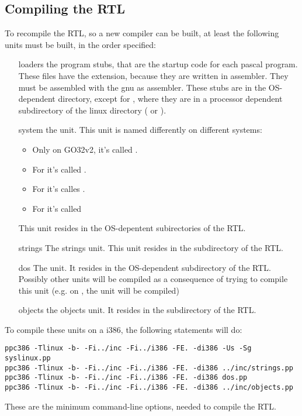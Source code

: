 \documentclass{report}
\begin{document}
\subsection{Compiling the RTL}
To recompile the RTL, so a new compiler can be built, at least the following
units must be built, in the order specified:
\begin{enumerate}
\item[loaders] the program stubs, that are the startup code for each pascal
program. These files have the  extension, because they are written
in assembler. They must be assembled with the gnu as assembler. These stubs
are in the OS-dependent directory, except for \linux, where they are in a
processor dependent subdirectory of the linux directory ( or
).
\item[system] the  unit. This unit is named differently on different
systems:
\begin{itemize}
\item Only on GO32v2, it's called .
\item For \linux it's called .
\item For \windowsnt it's calles .
\item For \ostwo it's called 
\end{itemize}
This unit resides in the OS-depentent subirectories of the RTL.
\item[strings] The strings unit. This unit resides in the 
subdirectory of the RTL.
\item[dos] The  unit. It resides in the OS-dependent subdirectory
of the RTL. Possibly other units will be compiled as a consequence of trying
to compile this unit (e.g. on \linux, the  unit will be compiled)
\item[objects] the objects unit. It resides in the  subdirectory
of the RTL.
\end{enumerate}
To compile these units on a i386, the following statements will do:
\begin{verbatim}
ppc386 -Tlinux -b- -Fi../inc -Fi../i386 -FE. -di386 -Us -Sg syslinux.pp
ppc386 -Tlinux -b- -Fi../inc -Fi../i386 -FE. -di386 ../inc/strings.pp
ppc386 -Tlinux -b- -Fi../inc -Fi../i386 -FE. -di386 dos.pp
ppc386 -Tlinux -b- -Fi../inc -Fi../i386 -FE. -di386 ../inc/objects.pp
\end{verbatim}
These are the minimum command-line options, needed to compile the RTL.
\end{document}
